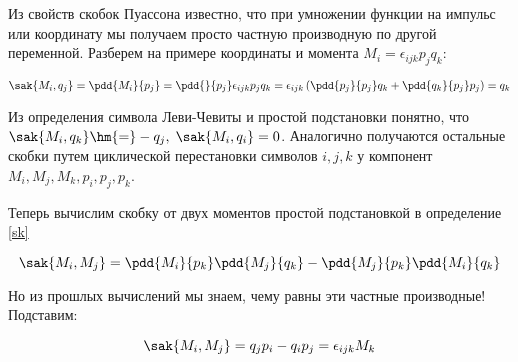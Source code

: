 \documentclass[12pt]{kiarticle}
\begin{document}
	Из свойств скобок Пуассона известно, что при умножении функции на импульс или координату мы получаем просто частную производную по другой переменной. Разберем на примере координаты и момента $ M_i = \epsilon_{ijk}p_jq_k $:
	
	\begin{equation}\label{}
	\sak{M_i, q_j} = \pdd{M_i}{p_j} = \pdd{}{p_j}\epsilon_{ijk}p_jq_k = \epsilon_{ijk} \left( \pdd{p_j}{p_j}q_k + \pdd{q_k}{p_j}p_j \right) = q_k
	\end{equation}
	
	Из определения символа Леви-Чевиты и простой подстановки понятно, что $ \sak{M_i, q_k} \hm{=} -q_j, \; \sak{M_i, q_i} = 0 $. Аналогично получаются остальные скобки путем циклической перестановки символов $ i, j, k $ у компонент $ M_i, M_j, M_k, p_i, p_j, p_k $. 
	
	Теперь вычислим скобку от двух моментов простой подстановкой в определение \eqref{sk}
	
	\begin{equation}\label{}
	\sak{M_i, M_j} = \pdd{M_i}{p_k}\pdd{M_j}{q_k} - \pdd{M_j}{p_k}\pdd{M_i}{q_k}
	\end{equation}
	
	Но из прошлых вычислений мы знаем, чему равны эти частные производные! Подставим: 
	
	\begin{equation}\label{}
		\sak{M_i, M_j} = q_jp_i - q_ip_j = \epsilon_{ijk} M_k
	\end{equation}
	
	
\end{document}
